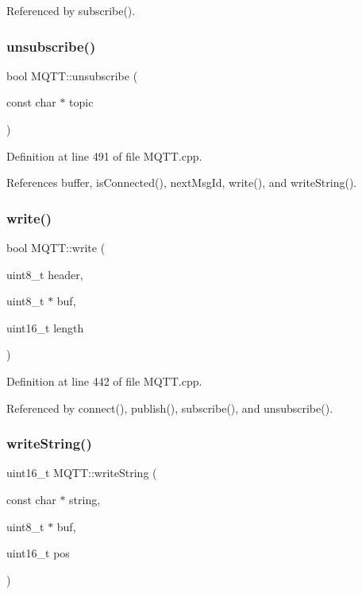 Referenced by subscribe().

\mbox{\label{class_m_q_t_t_a70bfce6554c3d08f7a0e174d23a8b642}} 
\subsubsection{\texorpdfstring{unsubscribe()}{unsubscribe()}}
{\footnotesize\ttfamily bool M\+Q\+T\+T\+::unsubscribe (\begin{DoxyParamCaption}\item[{const char $\ast$}]{topic }\end{DoxyParamCaption})}



Definition at line 491 of file M\+Q\+T\+T.\+cpp.



References buffer, is\+Connected(), next\+Msg\+Id, write(), and write\+String().

\mbox{\label{class_m_q_t_t_a19b7d1a9fae7e5176469c167a6919060}} 
\subsubsection{\texorpdfstring{write()}{write()}}
{\footnotesize\ttfamily bool M\+Q\+T\+T\+::write (\begin{DoxyParamCaption}\item[{uint8\+\_\+t}]{header,  }\item[{uint8\+\_\+t $\ast$}]{buf,  }\item[{uint16\+\_\+t}]{length }\end{DoxyParamCaption})\hspace{0.3cm}{\ttfamily [private]}}



Definition at line 442 of file M\+Q\+T\+T.\+cpp.



Referenced by connect(), publish(), subscribe(), and unsubscribe().

\mbox{\label{class_m_q_t_t_ae75a977549b28466d0a40cdf90e49c01}} 
\subsubsection{\texorpdfstring{write\+String()}{writeString()}}
{\footnotesize\ttfamily uint16\+\_\+t M\+Q\+T\+T\+::write\+String (\begin{DoxyParamCaption}\item[{const char $\ast$}]{string,  }\item[{uint8\+\_\+t $\ast$}]{buf,  }\item[{uint16\+\_\+t}]{pos }\end{DoxyParamCaption})\hspace{0.3cm}{\ttfamily [private]}}



